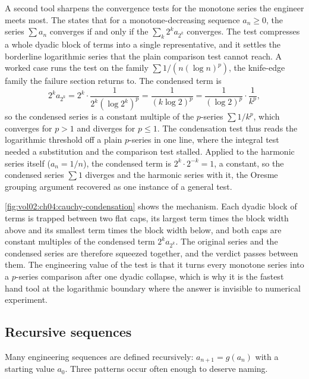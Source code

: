 A second tool sharpens the convergence tests for the monotone series the
engineer meets most. The  states that
for a monotone-decreasing sequence $a_{n} \geq 0$, the series $\sum a_{n}$
converges if and only if the  $\sum_{k}
2^{k} a_{2^{k}}$ converges. The test compresses a whole dyadic block of
terms into a single representative, and it settles the borderline
logarithmic series that the plain comparison test cannot reach. A worked
case runs the test on the family $\sum 1/(n(\log n)^{p})$, the knife-edge
family the failure section returns to. The condensed term is
\[
2^{k} a_{2^{k}} = 2^{k} \cdot \frac{1}{2^{k}(\log 2^{k})^{p}} =
\frac{1}{(k \log 2)^{p}} = \frac{1}{(\log 2)^{p}} \cdot \frac{1}{k^{p}},
\]
so the condensed series is a constant multiple of the $p$-series
$\sum 1/k^{p}$, which converges for $p > 1$ and diverges for $p \leq 1$.
The condensation test thus reads the logarithmic threshold off a plain
$p$-series in one line, where the integral test needed a substitution and
the comparison test stalled. Applied to the harmonic series itself
($a_{n} = 1/n$), the condensed term is $2^{k} \cdot 2^{-k} = 1$, a
constant, so the condensed series $\sum 1$ diverges and the harmonic
series with it, the Oresme grouping argument recovered as one instance of
a general test.



\autoref{fig:vol02:ch04:cauchy-condensation} shows the mechanism. Each
dyadic block of terms is trapped between two flat caps, its largest term
times the block width above and its smallest term times the block width
below, and both caps are constant multiples of the condensed term
$2^{k} a_{2^{k}}$. The original series and the condensed series are
therefore squeezed together, and the verdict passes between them. The
engineering value of the test is that it turns every monotone series into
a $p$-series comparison after one dyadic collapse, which is why it is the
fastest hand tool at the logarithmic boundary where the answer is
invisible to numerical experiment.

\subsection{Recursive sequences}

Many engineering sequences are defined recursively: $a_{n+1} = g(a_{n})$
with a starting value $a_{0}$. Three patterns occur often enough to
deserve naming.

